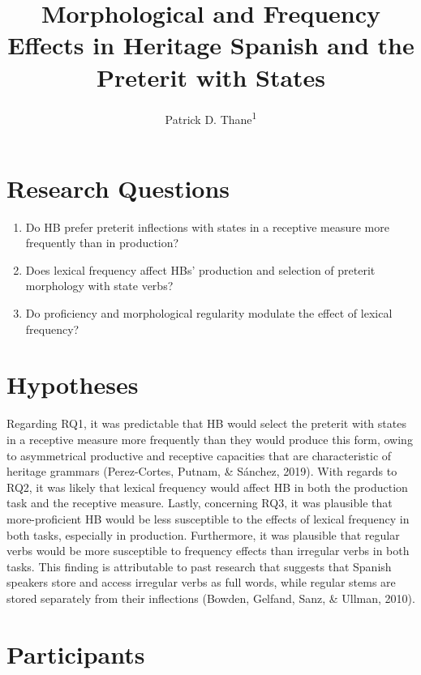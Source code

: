 \documentclass[
  english,
  man]{apa6}
\title{Morphological and Frequency Effects in Heritage Spanish and the Preterit with States}
\author{Patrick D. Thane\textsuperscript{1}}
\date{}
\affiliation{\vspace{0.5cm}\textsuperscript{1} Rutgers University}
\providecommand{\tightlist}{%
  \setlength{\itemsep}{0pt}\setlength{\parskip}{0pt}}
\begin{document}
\maketitle

\hypertarget{research-questions}{%
\section{Research Questions}\label{research-questions}}

\begin{enumerate}
\def\labelenumi{\arabic{enumi}.}
\tightlist
\item
  Do HB prefer preterit inflections with states in a receptive measure more frequently than in production?
\item
  Does lexical frequency affect HBs' production and selection of preterit morphology with state verbs?
\item
  Do proficiency and morphological regularity modulate the effect of lexical frequency?
\end{enumerate}

\hypertarget{hypotheses}{%
\section{Hypotheses}\label{hypotheses}}

Regarding RQ1, it was predictable that HB would select the preterit with states in a receptive measure more frequently than they would produce this form, owing to asymmetrical productive and receptive capacities that are characteristic of heritage grammars (Perez-Cortes, Putnam, \& Sánchez, 2019). With regards to RQ2, it was likely that lexical frequency would affect HB in both the production task and the receptive measure. Lastly, concerning RQ3, it was plausible that more-proficient HB would be less susceptible to the effects of lexical frequency in both tasks, especially in production. Furthermore, it was plausible that regular verbs would be more susceptible to frequency effects than irregular verbs in both tasks. This finding is attributable to past research that suggests that Spanish speakers store and access irregular verbs as full words, while regular stems are stored separately from their inflections (Bowden, Gelfand, Sanz, \& Ullman, 2010).

\hypertarget{participants}{%
\section{Participants}\label{participants}}
\end{document}
